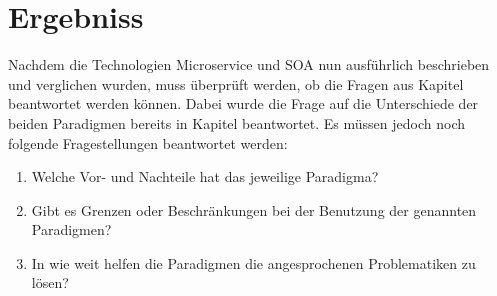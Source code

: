 \chapter{Ergebniss}
\label{chap:Ergebniss}
Nachdem die Technologien Microservice und SOA nun ausführlich beschrieben und verglichen wurden, muss überprüft werden, ob die Fragen aus Kapitel  beantwortet werden können. Dabei wurde die Frage auf die Unterschiede der beiden Paradigmen bereits in Kapitel  beantwortet. Es müssen jedoch noch folgende Fragestellungen beantwortet werden:

\begin{enumerate}
    \item Welche Vor- und Nachteile hat das jeweilige Paradigma?
    \item Gibt es Grenzen oder Beschränkungen bei der Benutzung der genannten Paradigmen?
    \item In wie weit helfen die Paradigmen die angesprochenen Problematiken zu lösen?
\end{enumerate}


